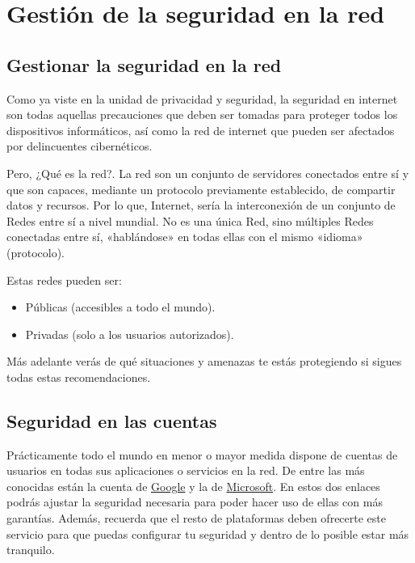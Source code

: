 \documentclass[
  a4paper,
  openany]{book}
\providecommand{\tightlist}{%
  \setlength{\itemsep}{0pt}\setlength{\parskip}{0pt}}
\begin{document}
\hypertarget{gestiuxf3n-de-la-seguridad-en-la-red}{%
\chapter{Gestión de la seguridad en la red}\label{gestiuxf3n-de-la-seguridad-en-la-red}}

\hypertarget{gestionar-la-seguridad-en-la-red}{%
\section{Gestionar la seguridad en la red}\label{gestionar-la-seguridad-en-la-red}}

Como ya viste en la unidad de privacidad y seguridad, la seguridad en internet son todas aquellas precauciones que deben ser tomadas para proteger todos los dispositivos informáticos, así como la red de internet que pueden ser afectados por delincuentes cibernéticos.

Pero, ¿Qué es la red?. La red son un conjunto de servidores conectados entre sí y que son capaces, mediante un protocolo previamente establecido, de compartir datos y recursos. Por lo que, Internet, sería la interconexión de un conjunto de Redes entre sí a nivel mundial. No es una única Red, sino múltiples Redes conectadas entre sí, «hablándose» en todas ellas con el mismo «idioma» (protocolo).

Estas redes pueden ser:

\begin{itemize}
\tightlist
\item
  Públicas (accesibles a todo el mundo).
\item
  Privadas (solo a los usuarios autorizados).
\end{itemize}

Más adelante verás de qué situaciones y amenazas te estás protegiendo si sigues todas estas recomendaciones.

\hypertarget{seguridad-en-las-cuentas}{%
\section{Seguridad en las cuentas}\label{seguridad-en-las-cuentas}}

Prácticamente todo el mundo en menor o mayor medida dispone de cuentas de usuarios en todas sus aplicaciones o servicios en la red. De entre las más conocidas están la cuenta de \href{https://myaccount.google.com/security}{Google} y la de \href{https://account.microsoft.com/security}{Microsoft}. En estos dos enlaces podrás ajustar la seguridad necesaria para poder hacer uso de ellas con más garantías. Además, recuerda que el resto de plataformas deben ofrecerte este servicio para que puedas configurar tu seguridad y dentro de lo posible estar más tranquilo.
\end{document}
